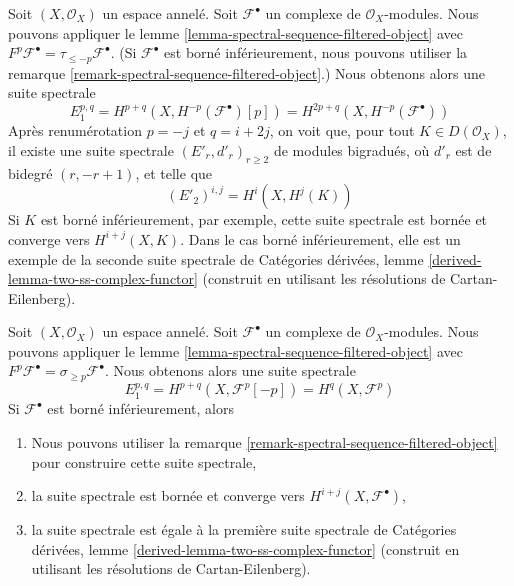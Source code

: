 \begin{example}

\label{example-spectral-sequence}

Soit $(X, \mathcal{O}_X)$ un espace annelé. Soit $\mathcal{F}^\bullet$ un complexe de $\mathcal{O}_X$-modules. Nous pouvons appliquer le lemme \ref{lemma-spectral-sequence-filtered-object}
avec $F^p\mathcal{F}^\bullet = \tau_{\leq -p}\mathcal{F}^\bullet$. (Si $\mathcal{F}^\bullet$ est borné inférieurement, nous pouvons utiliser la remarque \ref{remark-spectral-sequence-filtered-object}.) Nous obtenons alors une suite spectrale
$$
E_1^{p, q} = H^{p + q}(X, H^{-p}(\mathcal{F}^\bullet)[p]) =
H^{2p + q}(X, H^{-p}(\mathcal{F}^\bullet))
$$
Après renumérotation $p = -j$ et $q = i + 2j$, on voit que, pour tout
$K \in D(\mathcal{O}_X)$, il existe une suite spectrale
$(E'_r, d'_r)_{r \geq 2}$ de modules bigradués, où
$d'_r$ est de bidegré $(r, -r + 1)$, et telle que
$$
(E'_2)^{i, j} = H^i(X, H^j(K))
$$
Si $K$ est borné inférieurement, par exemple, cette suite spectrale est bornée et converge vers $H^{i + j}(X, K)$. Dans le cas borné inférieurement, elle est un exemple de la seconde suite spectrale de Catégories dérivées, lemme \ref{derived-lemma-two-ss-complex-functor}
(construit en utilisant les résolutions de Cartan-Eilenberg).

\end{example}

\begin{example}

\label{example-spectral-sequence-bis}

Soit $(X, \mathcal{O}_X)$ un espace annelé. Soit $\mathcal{F}^\bullet$ un complexe de $\mathcal{O}_X$-modules. Nous pouvons appliquer le lemme \ref{lemma-spectral-sequence-filtered-object}
avec $F^p\mathcal{F}^\bullet = \sigma_{\geq p}\mathcal{F}^\bullet$. Nous obtenons alors une suite spectrale
$$
E_1^{p, q} = H^{p + q}(X, \mathcal{F}^p[-p]) = H^q(X, \mathcal{F}^p)
$$
Si $\mathcal{F}^\bullet$ est borné inférieurement, alors

\begin{enumerate}

\item Nous pouvons utiliser la remarque \ref{remark-spectral-sequence-filtered-object}
pour construire cette suite spectrale,
\item la suite spectrale est bornée et converge vers
$H^{i + j}(X, \mathcal{F}^\bullet)$,
\item la suite spectrale est égale à la première suite spectrale de Catégories dérivées, lemme \ref{derived-lemma-two-ss-complex-functor}
(construit en utilisant les résolutions de Cartan-Eilenberg).

\end{enumerate}

\end{example}

